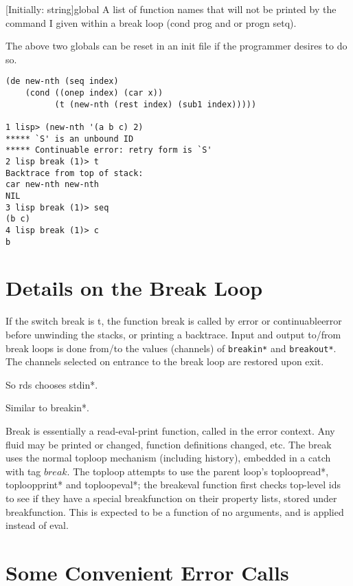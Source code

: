 {[Initially: string]}{global}
{
    A  list  of  function  names that will not be printed by the
    command I given within a break loop
    (cond prog and or progn setq).
}

\vspace{0.5cm}
The above two globals can be reset in  an  init  file  if  the
programmer desires to do so.
\begin{verbatim}
(de new-nth (seq index)
    (cond ((onep index) (car x))
          (t (new-nth (rest index) (sub1 index)))))

1 lisp> (new-nth '(a b c) 2)
***** `S' is an unbound ID
***** Continuable error: retry form is `S'
2 lisp break (1)> t
Backtrace from top of stack:
car new-nth new-nth
NIL
3 lisp break (1)> seq
(b c)
4 lisp break (1)> c
b
\end{verbatim}

\section{Details on the Break Loop}

  If  the  switch  break  is  t, the function break is called by
error or continuableerror  before    unwinding  the  stacks,  or
printing  a  backtrace.  Input and output to/from break loops is
done from/to the  values (channels) of {\tt breakin*}  and
{\tt breakout*}.
The  channels  selected  on    entrance  to  the break  loop are
restored upon exit.

{
    So rds chooses stdin*.
}

{
    Similar to breakin*.
}

\vspace{1cm}
		Break is essentially  a read-eval-print function,  called   in
the    error    context.   Any fluid may be  printed or changed,
function definitions  changed, etc.  The break uses  the  normal
toploop  mechanism (including history), embedded in a catch with
tag $break$.  The toploop attempts  to  use  the  parent  loop's
toploopread*,  toploopprint*  and  toploopeval*;  the  breakeval
function first checks top-level  ids  to  see  if  they  have  a
special  breakfunction  on  their  property  lists, stored under
breakfunction.   This  is  expected  to  be  a  function  of  no
arguments, and is applied instead of eval.

\section{Some Convenient Error Calls}

